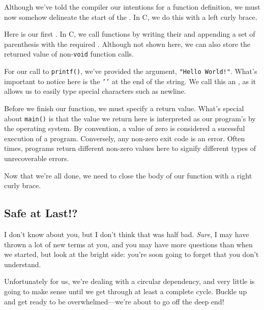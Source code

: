 
\noindent
Although we've told the compiler our intentions for a function
definition, we must now somehow delineate the start of the
.  In C, we do this with a left curly brace.


\noindent
Here is our first .  In C, we call functions by
writing their  and appending a set of parenthesis with
the required .  Although not shown here, we can also
store the returned value of non-\texttt{void} function calls.

For our call to \texttt{printf()}, we've provided the  argument, \texttt{"Hello World!\n"}.  What's
important to notice here is the \texttt{'\n'} at the end of the
string.  We call this an , as it allows us to
easily type special characters such as newline.


\noindent
Before we finish our function, we must specify a return value.  What's
special about \texttt{main()} is that the value we return here is
interpreted as our program's  by the operating system.
By convention, a value of zero is considered a sucessful execution of a
program.  Conversely, any non-zero exit code is an error.  Often times,
programs return different non-zero values here to signify different
types of unrecoverable errors.


\noindent
Now that we're all done, we need to close the body of our function with
a right curly brace.

\subsection{Safe at Last!?}

I don't know about you, but I don't think that was half bad. \emph{%
Sure}, I may have thrown a lot of new terms at you, and you may have
more questions than when we started, but look at the bright side: you're
soon going to forget that you don't understand.

Unfortunately for us, we're dealing with a circular dependency, and very
little is going to make sense until we get through at least a complete
cycle.  Buckle up and get ready to be overwhelmed---we're about to go off
the deep end!

